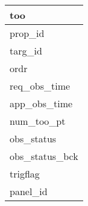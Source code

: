 \documentclass{article}
\begin{document}

\begin{tabular}{|l|} \hline
\textbf{too} \\ \hline
prop\_id \\ \hline
targ\_id \\ \hline
ordr \\ \hline
req\_obs\_time \\ \hline
app\_obs\_time \\ \hline
num\_too\_pt \\ \hline
obs\_status \\ \hline
obs\_status\_bck \\ \hline
trigflag \\ \hline
panel\_id \\ \hline
\end{tabular}
\end{document}

